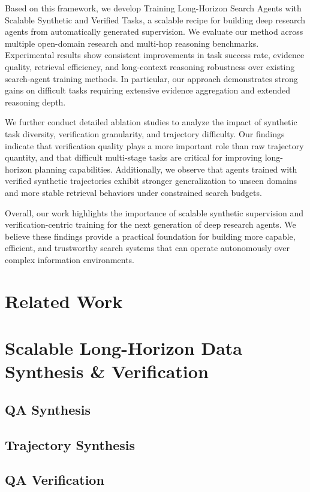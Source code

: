 \documentclass{article}
\begin{document}
Based on this framework, we develop Training Long-Horizon Search Agents with Scalable Synthetic and Verified Tasks, a scalable recipe for building deep research agents from automatically generated supervision. We evaluate our method across multiple open-domain research and multi-hop reasoning benchmarks. Experimental results show consistent improvements in task success rate, evidence quality, retrieval efficiency, and long-context reasoning robustness over existing search-agent training methods. In particular, our approach demonstrates strong gains on difficult tasks requiring extensive evidence aggregation and extended reasoning depth.

We further conduct detailed ablation studies to analyze the impact of synthetic task diversity, verification granularity, and trajectory difficulty. Our findings indicate that verification quality plays a more important role than raw trajectory quantity, and that difficult multi-stage tasks are critical for improving long-horizon planning capabilities. Additionally, we observe that agents trained with verified synthetic trajectories exhibit stronger generalization to unseen domains and more stable retrieval behaviors under constrained search budgets.

Overall, our work highlights the importance of scalable synthetic supervision and verification-centric training for the next generation of deep research agents. We believe these findings provide a practical foundation for building more capable, efficient, and trustworthy search systems that can operate autonomously over complex information environments.






\section{Related Work}

\section{Scalable Long-Horizon Data Synthesis \& Verification}
\subsection{QA Synthesis}
\subsection{Trajectory Synthesis}
\subsection{QA Verification}
\end{document}
